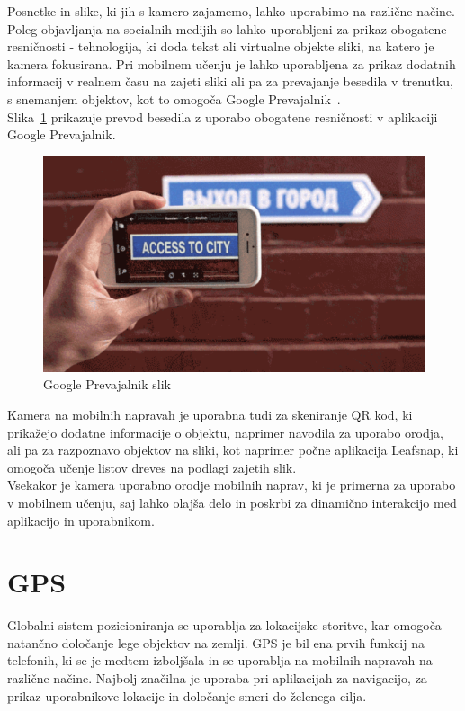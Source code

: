 \documentclass[a4paper, 12pt]{book}
\begin{document}
Posnetke in slike, ki jih s kamero zajamemo, lahko uporabimo na različne načine. Poleg objavljanja na socialnih medijih so lahko uporabljeni za prikaz obogatene resničnosti - tehnologija, ki doda tekst ali virtualne objekte sliki, na katero je kamera fokusirana. Pri mobilnem učenju je lahko uporabljena za prikaz dodatnih informacij v realnem času na zajeti sliki ali pa za prevajanje besedila v trenutku, s snemanjem objektov, kot to omogoča Google Prevajalnik~\cite{translate}.\\Slika~\ref{Gtranslate} prikazuje prevod besedila z uporabo obogatene resničnosti v aplikaciji Google Prevajalnik.
\begin{figure}[H]
\centering
\includegraphics[height=0.5\textwidth]{slike/translate}
\caption{Google Prevajalnik slik~\cite{GpictureTr}}\label{Gtranslate}
\end{figure}

\noindent Kamera na mobilnih napravah je uporabna tudi za skeniranje QR kod, ki prikažejo dodatne informacije o objektu, naprimer navodila za uporabo orodja, ali pa za razpoznavo objektov na sliki, kot naprimer počne aplikacija Leafsnap, ki omogoča učenje listov dreves na podlagi zajetih slik.\\Vsekakor je kamera uporabno orodje mobilnih naprav, ki je primerna za uporabo v mobilnem učenju, saj lahko olajša delo in poskrbi za dinamično interakcijo med aplikacijo in uporabnikom.
\section{GPS}
Globalni sistem pozicioniranja se uporablja za lokacijske storitve, kar omogoča natančno določanje lege objektov na zemlji. GPS je bil ena prvih funkcij na telefonih, ki se je medtem izboljšala in se uporablja na mobilnih napravah na različne načine. Najbolj značilna je uporaba pri aplikacijah za navigacijo, za prikaz uporabnikove lokacije in določanje smeri do želenega cilja.
\end{document}
